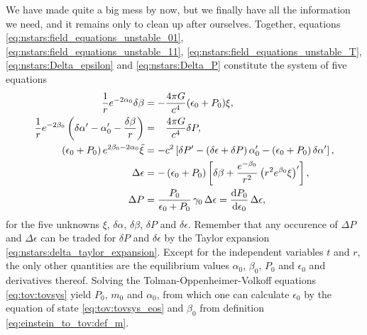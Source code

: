 We have made quite a big mess by now, but we finally have all the information we need, and it remains only to clean up after ourselves.
Together, equations \eqref{eq:nstars:field_equations_unstable_01}, \eqref{eq:nstars:field_equations_unstable_11}, \eqref{eq:nstars:field_equations_unstable_T}, \eqref{eq:nstars:Delta_epsilon} and \eqref{eq:nstars:Delta_P} constitute the system of five equations
\begin{subequations}
\begin{align}
	\frac{1}{r} e^{-2\alpha_0} \delta\beta                                                      &= -           \frac{4 \pi G}{c^4} (\epsilon_0 + P_0) \xi , \label{eq:nstars:perturbation_system_01} \\
	\frac{1}{r} e^{-2\beta_0} \left( \delta\alpha' - \alpha_0' - \frac{\delta \beta}{r} \right) &= \phantom{-} \frac{4 \pi G}{c^4} \delta P               , \label{eq:nstars:perturbation_system_11} \\
	\left( \epsilon_0 + P_0 \right) e^{2 \beta_0 - 2 \alpha_0} \ddot \xi                                                        &= -c^2 \left[ \delta P' - \left( \delta \epsilon + \delta P \right) \alpha_0' - \left( \epsilon_0 + P_0 \right) \delta \alpha' \right] , \label{eq:nstars:perturbation_system_euler} \\
	\Delta \epsilon                                                                                                             &= - \left( \epsilon_0 + P_0 \right) \left[ \delta\beta + \frac{e^{-\beta_0}}{r^2} \left( r^2 e^{\beta_0} \xi \right)' \right]  , \label{eq:nstars:perturbation_system_energy_conservation} \\
	\Delta P &= \frac{P_0}{\epsilon_0 + P_0} \, \gamma_0 \, \Delta \epsilon = \odv{P_0}{\epsilon_0} \, \Delta\epsilon, \label{eq:nstars:perturbation_system_adiabadicity}
\end{align}%
\label{eq:nstars:perturbation_system}%
\end{subequations}%
for the five unknowns $\xi$, $\delta \alpha$, $\delta \beta$, $\delta P$ and $\delta \epsilon$.
Remember that any occurence of $\Delta P$ and $\Delta \epsilon$ can be traded for $\delta P$ and $\delta \epsilon$ by the Taylor expansion \eqref{eq:nstars:delta_taylor_expansion}.
Except for the independent variables $t$ and $r$, the only other quantities are the equilibrium values $\alpha_0$, $\beta_0$, $P_0$ and $\epsilon_0$ and derivatives thereof.
Solving the Tolman-Oppenheimer-Volkoff equations \eqref{eq:tov:tovsys} yield $P_0$, $m_0$ and $\alpha_0$, from which one can calculate $\epsilon_0$ by the equation of state \eqref{eq:tov:tovsys_eos} and $\beta_0$ from definition \eqref{eq:einstein_to_tov:def_m}.

